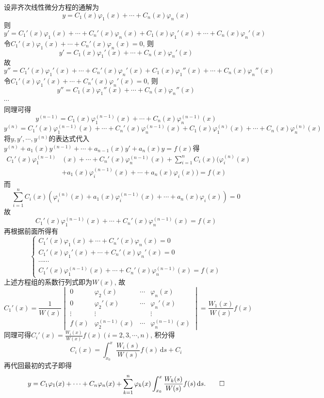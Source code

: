 \documentclass[titlepage,11pt,a4paper,twoside]{report}
\makeatletter
\newcommand\diff{\,\mathrm{d}}
\renewenvironment{proof}{\par
	\pushQED{\qed}%
	\normalfont \topsep1\p@\@plus6\p@\relax
	\trivlist
	\item\relax
	{\hspace*{\parindent}{\heiti 证明}\@addpunct{:}}\hspace\labelsep\ignorespaces
}{%
	\popQED\endtrivlist\@endpefalse
}
\makeatother
\begin{document}
\begin{proof} 
设非齐次线性微分方程的通解为
\[y=C_1(x)\varphi_1(x)+\cdots+C_n(x)\varphi_n(x)\]
则\[y'=C_1'(x)\varphi_1(x)+\cdots+C_n'(x)\varphi_n(x)+C_1(x)\varphi_1'(x)+\cdots+C_n(x)\varphi_n'(x)\]
令$C_1'(x)\varphi_1(x)+\cdots+C_n'(x)\varphi_n(x)=0$, 则
\[y'=C_1(x)\varphi_1'(x)+\cdots+C_n(x)\varphi_n'(x)\]
故
\[y''=C_1'(x)\varphi_1'(x)+\cdots+C_n'(x)\varphi_n'(x)+C_1(x)\varphi_1''(x)+\cdots+C_n(x)\varphi_n''(x)\]
令$C_1'(x)\varphi_1'(x)+\cdots+C_n'(x)\varphi_n'(x)=0$, 则
\[y''=C_1(x)\varphi_1''(x)+\cdots+C_n(x)\varphi_n''(x)\]
$\cdots$\\
同理可得\[y^{(n-1)}=C_1(x)\varphi_1^{(n-1)}(x)+\cdots+C_n(x)\varphi_n^{(n-1)}(x)\]
\[y^{(n)}=C_1'(x)\varphi_1^{(n-1)}(x)+\cdots+C_n'(x)\varphi_n^{(n-1)}(x)+C_1(x)\varphi_1^{(n)}(x)+\cdots+C_n(x)\varphi_n^{(n)}(x)\]
将$y,y',\cdots,y^{(n)}$的表达式代入$y^{(n)}+a_1(x)y^{(n-1)}+\cdots+a_{n-1}(x)y'+a_n(x)y=f(x)$得
\[\begin{split}C_1'(x)\varphi_1^{(n-1)}&(x)+\cdots+C_n'(x)\varphi_n^{(n-1)}(x)+\sum_{i=1}^nC_i(x)\bigg(\varphi_i^{(n)}(x)\\&+a_1(x)\varphi_i^{(n-1)}(x)+\cdots+a_n(x)\varphi_i(x)\bigg)=f(x)\end{split}\]
而\[\sum_{i=1}^nC_i(x)\left(\varphi_i^{(n)}(x)+a_1(x)\varphi_i^{(n-1)}(x)+\cdots+a_n(x)\varphi_i(x)\right)=0\]
故\[C_1'(x)\varphi_1^{(n-1)}(x)+\cdots+C_n'(x)\varphi_n^{(n-1)}(x)=f(x)\]
再根据前面所得有
\[\begin{cases}
C_1'(x)\varphi_1(x)+\cdots+C_n'(x)\varphi_n(x)=0\\
C_1'(x)\varphi_1'(x)+\cdots+C_n'(x)\varphi_n'(x)=0\\
\cdots\cdots\\
C_1'(x)\varphi_1^{(n-1)}(x)+\cdots+C_n'(x)\varphi_n^{(n-1)}(x)=f(x)
\end{cases}\]
上述方程组的系数行列式即为$W(x)$, 故
\[C_1'(x)=\frac{1}{W(x)}\begin{vmatrix}0&\varphi_2(x)&\cdots&\varphi_n(x)\\
0&\varphi_2'(x)&\cdots&\varphi_n'(x)\\
\vdots&\vdots&&\vdots\\
f(x)&\varphi_2^{(n-1)}(x)&\cdots&\varphi_n^{(n-1)}(x)\end{vmatrix}=\frac{W_1(x)}{W(x)}f(x)\]
同理可得$\displaystyle C_i'(x)=\frac{W_i(x)}{W(x)}f(x)(i=2,3,\cdots,n)$, 积分得
\[C_i(x)=\int_{x_0}^x\frac{W_i(s)}{W(s)}f(s)\diff s+C_i\]
再代回最初的式子即得
\[y=C_1\varphi_1(x)+\cdots+C_n\varphi_n(x)+\sum_{k=1}^n\varphi_k(x)\int_{x_0}^x\frac{W_k(s)}{W(s)}f(s)\diff s.\qedhere\]
\end{proof}
\end{document}
